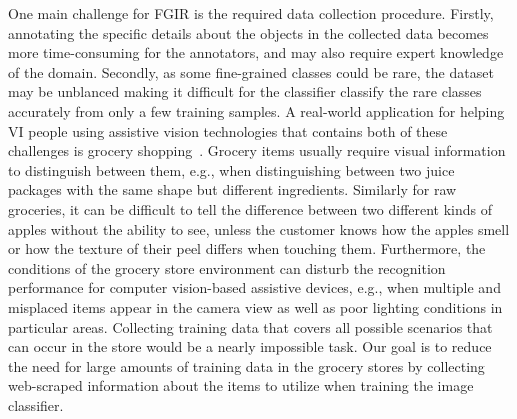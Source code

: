 One main challenge for FGIR is the required data collection procedure. Firstly, annotating the specific details about the objects in the collected data becomes more time-consuming for the annotators, and may also require expert knowledge of the domain.  
Secondly, as some fine-grained classes could be rare, the dataset may be unblanced making it difficult for the classifier classify the rare classes accurately from only a few training samples. 
A real-world application for helping VI people using assistive vision technologies that contains both of these challenges is grocery shopping~\cite{jafri2014computer,lanigan2006trinetra,winlock2010toward,sosa2017hands,boldu2020aisee,zientara2017third,george2015fine}. Grocery items usually require visual information to distinguish between them, e.g., when distinguishing between two juice packages with the same shape but different ingredients. Similarly for raw groceries, it can be difficult to tell the difference between two different kinds of apples without the ability to see, unless the customer knows how the apples smell or how the texture of their peel differs when touching them. Furthermore, the conditions of the grocery store environment can disturb the recognition performance for computer vision-based assistive devices, e.g., when multiple and misplaced items appear in the camera view as well as poor lighting conditions in particular areas. Collecting training data that covers all possible scenarios that can occur in the store would be a nearly impossible task. Our goal is to reduce the need for large amounts of training data in the grocery stores by collecting web-scraped information about the items to utilize when training the image classifier. 

